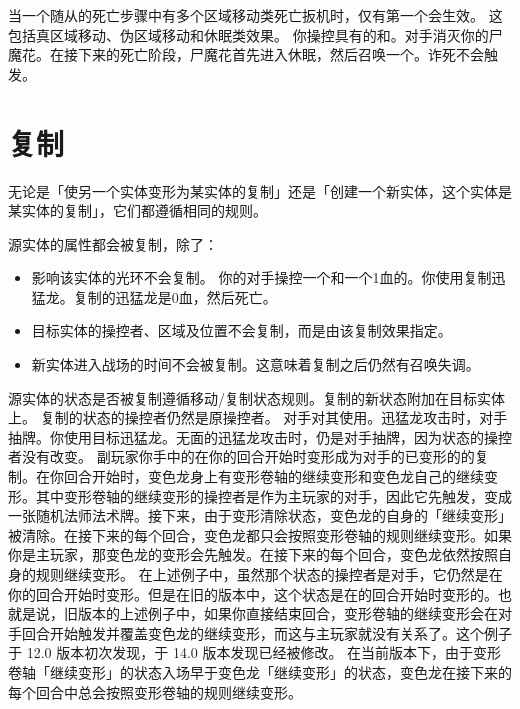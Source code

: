 当一个随从的死亡步骤中有多个区域移动类死亡扳机时，仅有第一个会生效。
\notice 这包括真区域移动、伪区域移动和休眠类效果。
\example 你操控具有的和。对手消灭你的尸魔花。在接下来的死亡阶段，尸魔花首先进入休眠，然后召唤一个。诈死不会触发。

\section{复制}

无论是「使另一个实体变形为某实体的复制」还是「创建一个新实体，这个实体是某实体的复制」，它们都遵循相同的规则。

源实体的属性都会被复制，除了：
\begin{itemize}
    \item 影响该实体的光环不会复制。
        \example 你的对手操控一个和一个1血的。你使用复制迅猛龙。复制的迅猛龙是0血，然后死亡。
    \item 目标实体的操控者、区域及位置不会复制，而是由该复制效果指定。
    \item 新实体进入战场的时间不会被复制。这意味着复制之后仍然有召唤失调。
\end{itemize}

源实体的状态是否被复制遵循移动/复制状态规则。复制的新状态附加在目标实体上。
\notice 复制的状态的操控者仍然是原操控者。
\example 对手对其使用。迅猛龙攻击时，对手抽牌。你使用目标迅猛龙。无面的迅猛龙攻击时，仍是对手抽牌，因为状态的操控者没有改变。
\example {}副玩家你手中的在你的回合开始时变形成为对手的已变形的的复制。在你回合开始时，变色龙身上有变形卷轴的继续变形和变色龙自己的继续变形。其中变形卷轴的继续变形的操控者是作为主玩家的对手，因此它先触发，变成一张随机法师法术牌。接下来，由于变形清除状态，变色龙的自身的「继续变形」被清除。在接下来的每个回合，变色龙都只会按照变形卷轴的规则继续变形。如果你是主玩家，那变色龙的变形会先触发。在接下来的每个回合，变色龙依然按照自身的规则继续变形。
\notice {}在上述例子中，虽然那个状态的操控者是对手，它仍然是在你的回合开始时变形。但是在旧的版本中，这个状态是在的回合开始时变形的。也就是说，旧版本的上述例子中，如果你直接结束回合，变形卷轴的继续变形会在对手回合开始触发并覆盖变色龙的继续变形，而这与主玩家就没有关系了。这个例子于 12.0 版本初次发现，于 14.0 版本发现已经被修改。
\notice {}在当前版本下，由于变形卷轴「继续变形」的状态入场早于变色龙「继续变形」的状态，变色龙在接下来的每个回合中总会按照变形卷轴的规则继续变形。

